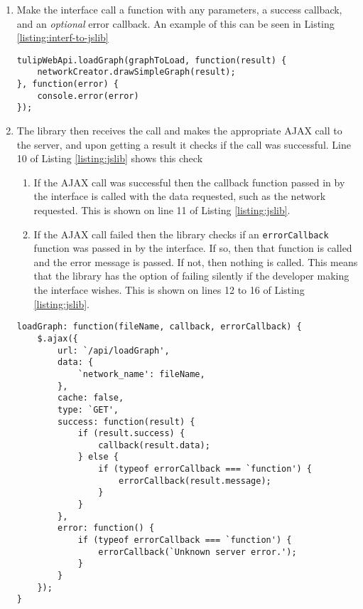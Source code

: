 \documentclass[../dissertation.tex]{subfiles}
\begin{document}
\begin{enumerate}
    \item Make the interface call a function with any parameters, a success callback, and an \emph{optional} error callback. An example of this can be seen in Listing \ref{listing:interf-to-jslib}
    
    \begin{lstlisting}[caption=How the interface would call the JavaScript library, label=listing:interf-to-jslib]
tulipWebApi.loadGraph(graphToLoad, function(result) {
	networkCreator.drawSimpleGraph(result);
}, function(error) {
	console.error(error)
});
    \end{lstlisting}
    
    \item The library then receives the call and makes the appropriate AJAX call to the server, and upon getting a result it checks if the call was successful. Line 10 of Listing \ref{listing:jslib} shows this check
    \begin{enumerate}
        \item If the AJAX call was successful then the callback function passed in by the interface is called with the data requested, such as the network requested. This is shown on line 11 of Listing \ref{listing:jslib}.
        \item If the AJAX call failed then the library checks if an \texttt{errorCallback} function was passed in by the interface. If so, then that function is called and the error message is passed. If not, then nothing is called. This means that the library has the option of failing silently if the developer making the interface wishes. This is shown on lines 12 to 16 of Listing \ref{listing:jslib}.
    \end{enumerate}
    
    \begin{lstlisting}[caption=How the JavaScript library catches and passes errors, label=listing:jslib]
loadGraph: function(fileName, callback, errorCallback) {
	$.ajax({
		url: `/api/loadGraph',
		data: {
	        `network_name': fileName,
	    },
	    cache: false,
	    type: `GET',
		success: function(result) {
			if (result.success) {
        		callback(result.data);
			} else {
				if (typeof errorCallback === `function') {
					errorCallback(result.message);
				}
			}
        },
		error: function() {
			if (typeof errorCallback === `function') {
				errorCallback(`Unknown server error.');
			}
        }
    });
}
    \end{lstlisting}

\end{enumerate}
\end{document}
